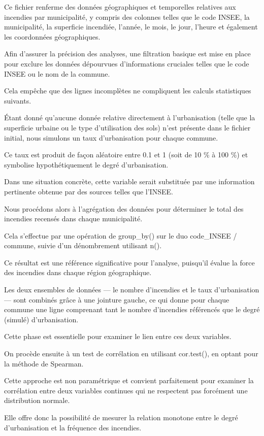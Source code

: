 \documentclass[
]{article}
\begin{document}
Ce fichier renferme des données géographiques et temporelles relatives
aux incendies par municipalité, y compris des colonnes telles que le
code INSEE, la municipalité, la superficie incendiée, l'année, le mois,
le jour, l'heure et également les coordonnées géographiques.

Afin d'assurer la précision des analyses, une filtration basique est
mise en place pour exclure les données dépourvues d'informations
cruciales telles que le code INSEE ou le nom de la commune.

Cela empêche que des lignes incomplètes ne compliquent les calculs
statistiques suivants.

Étant donné qu'aucune donnée relative directement à l'urbanisation
(telle que la superficie urbaine ou le type d'utilisation des sols)
n'est présente dans le fichier initial, nous simulons un taux
d'urbanisation pour chaque commune.

Ce taux est produit de façon aléatoire entre 0.1 et 1 (soit de 10 \% à
100 \%) et symbolise hypothétiquement le degré d'urbanisation.

Dans une situation concrète, cette variable serait substituée par une
information pertinente obtenue par des sources telles que l'INSEE.

Nous procédons alors à l'agrégation des données pour déterminer le total
des incendies recensés dans chaque municipalité.

Cela s'effectue par une opération de group\_by() sur le duo code\_INSEE
/ commune, suivie d'un dénombrement utilisant n().

Ce résultat est une référence significative pour l'analyse, puisqu'il
évalue la force des incendies dans chaque région géographique.

Les deux ensembles de données --- le nombre d'incendies et le taux
d'urbanisation --- sont combinés grâce à une jointure gauche, ce qui
donne pour chaque commune une ligne comprenant tant le nombre
d'incendies référencés que le degré (simulé) d'urbanisation.

Cette phase est essentielle pour examiner le lien entre ces deux
variables.

On procède ensuite à un test de corrélation en utilisant cor.test(), en
optant pour la méthode de Spearman.

Cette approche est non paramétrique et convient parfaitement pour
examiner la corrélation entre deux variables continues qui ne respectent
pas forcément une distribution normale.

Elle offre donc la possibilité de mesurer la relation monotone entre le
degré d'urbanisation et la fréquence des incendies.
\end{document}
